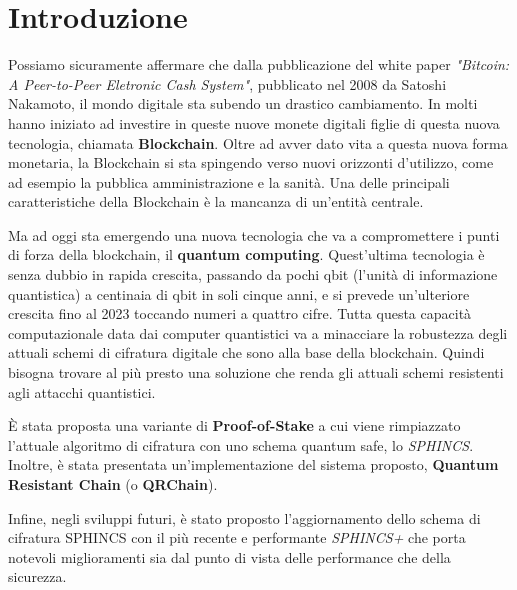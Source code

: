 \chapter*{Introduzione}
Possiamo sicuramente affermare che dalla pubblicazione del white paper \textit{"Bitcoin: A Peer-to-Peer Eletronic Cash System"}, pubblicato nel 2008 da Satoshi Nakamoto, il mondo digitale sta subendo un drastico cambiamento. In molti hanno iniziato ad investire in queste nuove monete digitali figlie di questa nuova tecnologia, chiamata \textbf{Blockchain}. Oltre ad avver dato vita a questa nuova forma monetaria, la Blockchain si sta spingendo verso nuovi orizzonti d'utilizzo, come ad esempio la pubblica amministrazione e la sanità. Una delle principali caratteristiche della Blockchain è la mancanza di un'entità centrale.

Ma ad oggi sta emergendo una nuova tecnologia che va a compromettere i punti di forza della blockchain, il \textbf{quantum computing}. Quest'ultima tecnologia è senza dubbio in rapida crescita, passando da pochi qbit (l'unità di informazione quantistica) a centinaia di qbit in soli cinque anni, e si prevede un'ulteriore crescita fino al 2023 toccando numeri a quattro cifre. Tutta questa capacità computazionale data dai computer quantistici va a minacciare la robustezza degli attuali schemi di cifratura digitale che sono alla base della blockchain. Quindi bisogna trovare al più presto una soluzione che renda gli attuali schemi resistenti agli attacchi quantistici.

È stata proposta una variante di \textbf{Proof-of-Stake} a cui viene rimpiazzato l'attuale algoritmo di cifratura con uno schema quantum safe, lo \textit{SPHINCS}. Inoltre, è stata presentata un'implementazione del sistema proposto, \textbf{Quantum Resistant Chain} (o \textbf{QRChain}).

Infine, negli sviluppi futuri, è stato proposto l'aggiornamento dello schema di cifratura SPHINCS con il più recente e performante \textit{SPHINCS+} che porta notevoli miglioramenti sia dal punto di vista delle performance che della sicurezza.

